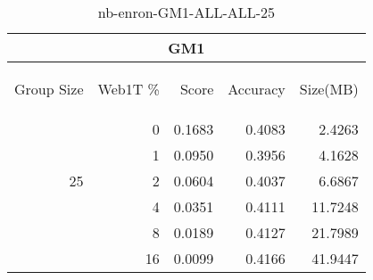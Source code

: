 \begin{center}
\begin{table}[htbp] 
 \begin{center}
\begin{tabular}{ | r | r | r | r | r |}
\hline
\multicolumn{5}{|c|}{GM1}\\
\hline
\begin{sideways}Group Size\end{sideways} & \begin{sideways}Web1T \%\end{sideways} & \begin{sideways}Score\end{sideways} & \begin{sideways}Accuracy\end{sideways} & \begin{sideways}Size(MB)\end{sideways}\\
\hline
\multirow{5}{*}{25}
 & 0 & 0.1683 & 0.4083 & 2.4263\\ \cline{2-5}
 & 1 & 0.0950 & 0.3956 & 4.1628\\ \cline{2-5}
 & 2 & 0.0604 & 0.4037 & 6.6867\\ \cline{2-5}
 & 4 & 0.0351 & 0.4111 & 11.7248\\ \cline{2-5}
 & 8 & 0.0189 & 0.4127 & 21.7989\\ \cline{2-5}
 & 16 & 0.0099 & 0.4166 & 41.9447\\ \cline{2-5}
\hline
\end{tabular}
\caption{nb-enron-GM1-ALL-ALL-25}
\label{table:nb-enron-GM1-ALL-ALL-25}
\end{center}
 \end{table}
\end{center}

